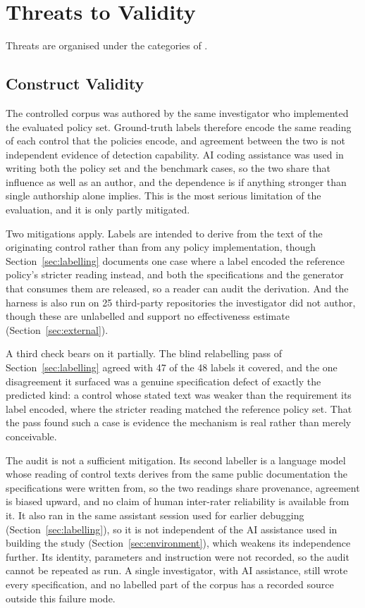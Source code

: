 \documentclass[smallextended]{svjour3}
\begin{document}
\section{Threats to Validity}
\label{sec:threats}

Threats are organised under the categories of
\citet{wohlin2012experimentation}.

\subsection{Construct Validity}
\label{sec:construct}
The controlled corpus was authored by the same investigator who implemented the
evaluated policy set. Ground-truth labels therefore encode the same reading of
each control that the policies encode, and agreement between the two is not
independent evidence of detection capability. AI coding assistance was used in
writing both the policy set and the benchmark cases, so the two share that
influence as well as an author, and the dependence is if anything stronger than
single authorship alone implies. This is the most serious limitation
of the evaluation, and it is only partly mitigated.

Two mitigations apply. Labels are intended to derive from the text of the
originating control rather than from any policy implementation, though
Section~\ref{sec:labelling} documents one case where a label encoded the reference
policy's stricter reading instead, and both the specifications and the
generator that consumes them are released, so a reader can audit the derivation.
And the harness is also run on 25 third-party repositories the investigator did
not author, though these are unlabelled and support no effectiveness estimate
(Section~\ref{sec:external}).

A third check bears on it partially. The blind relabelling pass of
Section~\ref{sec:labelling} agreed with 47 of the 48 labels it covered, and the one
disagreement it surfaced was a genuine specification defect of exactly the
predicted kind: a control whose stated text was weaker than the requirement its
label encoded, where the stricter reading matched the reference policy set. That
the pass found such a case is evidence the mechanism is real rather than merely
conceivable.

The audit is not a sufficient mitigation. Its second labeller is a language model
whose reading of control texts derives from the same public documentation the
specifications were written from, so the two readings share provenance, agreement
is biased upward, and no claim of human inter-rater reliability is available from
it. It also ran in the same assistant session used for earlier debugging
(Section~\ref{sec:labelling}), so it is not independent of the AI assistance used
in building the study (Section~\ref{sec:environment}), which weakens its
independence further. Its
identity, parameters and instruction were not recorded, so the audit cannot be
repeated as run. A single investigator, with AI assistance, still wrote every
specification, and no labelled part of the corpus has a recorded source outside
this failure mode.
\end{document}
